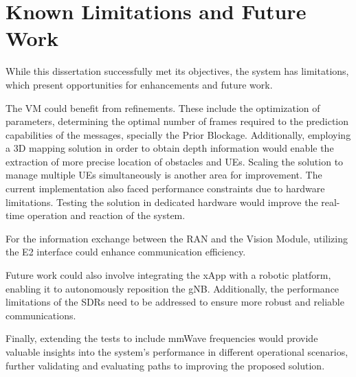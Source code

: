 \section{Known Limitations and Future Work}\label{sec:fut_work}
While this dissertation successfully met its objectives, the system has limitations, which present opportunities for enhancements and future work.

The VM could benefit from refinements.
These include the optimization of parameters, determining the optimal number of frames required to the prediction capabilities of the messages, specially the Prior Blockage.
Additionally, employing a 3D mapping solution in order to obtain depth information would enable the extraction of more precise location of obstacles and UEs.
Scaling the solution to manage multiple UEs simultaneously is another area for improvement.
The current implementation also faced performance constraints due to hardware limitations.
Testing the solution in dedicated hardware would improve the real-time operation and reaction of the system.

For the information exchange between the RAN and the Vision Module, utilizing the E2 interface could enhance communication efficiency.

Future work could also involve integrating the xApp with a robotic platform, enabling it to autonomously reposition the gNB\@.
Additionally, the performance limitations of the SDRs need to be addressed to ensure more robust and reliable communications.

Finally, extending the tests to include mmWave frequencies would provide valuable insights into the system's performance in different operational scenarios, further validating and evaluating paths to improving the proposed solution.





    


